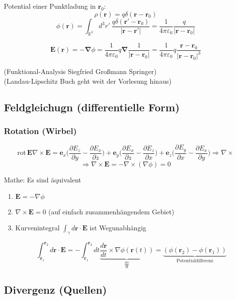\documentclass[titlepage,11pt,a4paper,ngerman]{report}
\newcommand{\prt}[2]{\frac{\partial #1}{\partial #2}}
\newcommand{\eofr}{\vec{E}(\vec{r})}
\newcommand{\kq}{\frac{1}{4\pi\epsilon_0}}
\newcommand{\intt}[2]{\int_{#1}^{#2}}
\renewcommand{\vec}[1]{\boldsymbol{#1}}
\newcommand{\lcom}[1]{\color{MidnightBlue}#1\color{black}}
\renewcommand{\epsilon}{\varepsilon}
\newcommand{\vabla}{\boldsymbol{\nabla}}
\renewcommand{\paragraph}[1]{\subsubsection{#1}}
\begin{document}
Potential einer Punktladung in $\vec{r}_0$:
$$\rho(\vec{r}) = q \delta(\vec{r}-\vec{r}_0)$$
$$\phi(\vec{r}) = \int_{\mathbb R^3} d^3 r'\ \frac{q\delta(\vec{r}' - \vec{r}_0)}{|\vec{r}-\vec{r}'|} = \kq \frac{q}{|\vec{r} - \vec{r}_0|}$$

$$\eofr = - \vabla \phi = \kq q \vabla \frac{1}{|\vec{r} - \vec{r}_0|} = \kq q \frac{\vec{r} - \vec{r}_0}{|\vec{r} - \vec{r}_0|^3}$$


\noindent
\lcom{(Funktional-Analysis Siegfried Großmann Springer)\\
(Landau-Lipschitz Buch geht weit der Vorlesung hinaus)}






\subsection{Feldgleichugn (differentielle Form)}

\paragraph{Rotation (Wirbel)}
$$\textrm{rot}\, \vec{E} \nabla \times \vec{E} = \vec{e}_x \bigg(\prt{E_z}{y} - \prt{E_x}{z}\bigg) + \vec{e}_y \bigg(\prt{E_x}{z} - \prt{E_z}{x}\bigg) + \vec{e}_z \bigg(\prt{E_y}{x} - \prt{E_x}{y}\bigg) \Rightarrow \nabla \times$$
$$\Rightarrow \nabla \times \vec{E} = - \nabla \times (\nabla\phi) = 0$$

Mathe: Es sind äquivalent 
\begin{enumerate}[i]
	\item $\vec{E} = - \nabla\phi$
	\item $\nabla \times \vec{E} = 0$ (auf einfach zusammenhängendem Gebiet)
	\item Kurvenintegral $\int_\gamma d\vec{r} \cdot \vec{E}$ ist Wegunabhängig 
	
	
	
	
	
	
	
	$$\intt{\vec{r}_1}{\vec{r}_2} d\vec{r} \cdot \vec{E} = - \intt{\vec{r}_1}{\vec{r}_2} dt \underbrace{\frac{d\vec{r}}{dt}\times \nabla\phi(\vec{r}(t))}_{\frac{d\phi}{dt}} = \underbrace{(\phi(\vec{r}_2) - \phi(\vec{r}_1))}_{\textrm{Potentialdifferenz}} $$
\end{enumerate}

\subsection{Divergenz (Quellen)}
\end{document}
